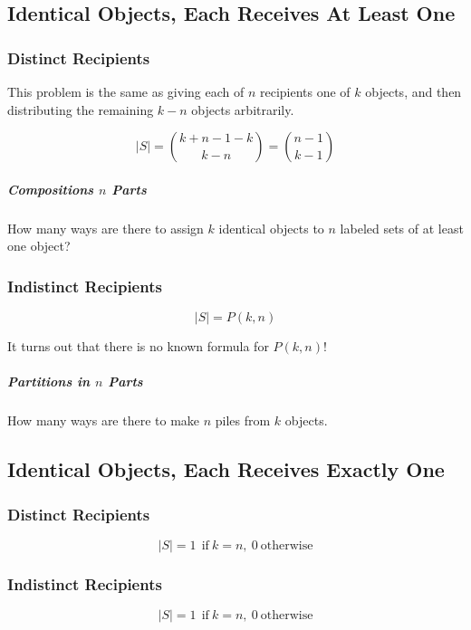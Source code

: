 \subsection{Identical Objects, Each Receives At Least One}

\subsubsection{Distinct Recipients}
This problem is the same as giving each of $n$ recipients one of $k$ objects, and then distributing the remaining $k-n$ objects arbitrarily.  

\begin{equation}
|S| = {k+n-1-k \choose k-n}= {n-1 \choose k-1}
\end{equation}

\subparagraph{Compositions $n$ Parts} How many ways are there to assign $k$ identical objects to $n$ labeled sets of at least one object?

\subsubsection{Indistinct Recipients}

\begin{equation}
|S| = P(k,n)
\end{equation}

It turns out that there is no known formula for $P(k,n)$!

\subparagraph{Partitions in $n$ Parts} How many ways are there to make $n$ piles from $k$ objects.

\subsection{Identical Objects, Each Receives Exactly One}

\subsubsection{Distinct Recipients}

\begin{equation}
|S| = 1\ \ \mathrm{if\ }k = n,\ 0\ \mathrm{otherwise}
\end{equation}  

\subsubsection{Indistinct Recipients}

\begin{equation}
|S| = 1\ \ \mathrm{if\ }k = n,\ 0\ \mathrm{otherwise}
\end{equation}  








